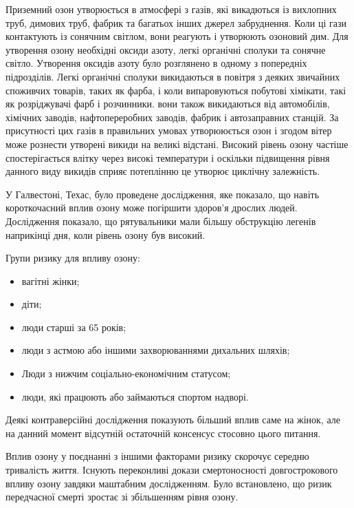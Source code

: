 Приземний озон утворюється в атмосфері з газів, які викадються із вихлопних труб, димових труб, 
фабрик та багатьох інших джерел забруднення. Коли ці гази контактують із сонячним світлом, 
вони реагують і утворюють озоновий дим. Для утворення озону необхідні оксиди азоту, легкі органічні сполуки та сонячне світло. Утворення оксидів азоту було розглянено в одному з 
попередніх підрозділів. Легкі органічні сполуки викидаються в повітря з деяких звичайних 
споживчих товарів, таких як фарба, і коли випаровуються побутові хімікати, такі як розріджувачі 
фарб і розчинники. вони також викидаються від автомобілів, хімічних заводів, нафтопереробних 
заводів, фабрик і автозаправних станцій. За присутності цих газів в правильних умовах 
утворююється озон і згодом вітер може рознести утворені викиди на великі відстані. 
Високий рівень озону частіше спостерігається влітку через високі температури і оскільки 
підвищення рівня данного виду викидів сприяє потеплінню це утворює циклічну залежність. \cite{___2010,association_ozone_nodate}

У Галвестоні, Техас, було проведене дослідження, яке показало, що навіть короткочасний вплив 
озону може погіршити здоров'я дрослих людей. Дослідження показало, що рятувальники мали більшу 
обструкцію легенів наприкінці дня, коли рівень озону був високий.

Групи ризику для впливу озону:

\begin{itemize}
    \item вагітні жінки;
    \item діти;
    \item люди старші за 65 років;
    \item люди з астмою або іншими захворюваннями дихальних шляхів;
    \item Люди з нижчим соціально-економічним статусом;
    \item люди, які працюють або займаються спортом надворі.
\end{itemize}

Деякі контраверсійні дослідження показують більший вплив саме на жінок, але на данний момент 
відсутній остаточній консенсус стосовно цього питання.

Вплив озону у поєднанні з іншими факторами ризику скорочує середню тривалість життя. Існують 
переконливі докази смертоносності довгострокового впливу озону завдяки маштабним дослідженням. 
Було встановлено, що ризик передчасної смерті зростає зі збільшенням рівня озону. \cite{us_epa_health_2015,admin_ozone_2022}

